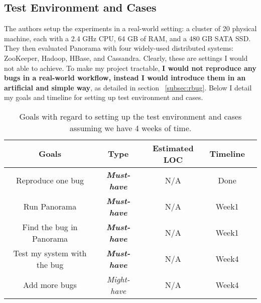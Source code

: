 \subsection{Test Environment and Cases}
The authors setup the experiments in a real-world setting: a cluster of 20 physical machine, each with a 2.4 GHz CPU, 64 GB of RAM, and a 480 GB SATA SSD. They then evaluated Panorama with four widely-used distributed systems: ZooKeeper, Hadoop, HBase, and Cassandra. Clearly, these are settings I would not able to achieve. To make my project tractable, \textbf{I would not reproduce any bugs in a real-world workflow, instead I would introduce them in an artificial and simple way}, as detailed in section ~\ref{subsec:rbug}. Below I detail my goals and timeline for setting up test environment and cases. 

\begin{table}[h!]
  \centering
  \begin{tabular}{ |c|c|c|c|c| } 
  \hline
  Goals & Type & Estimated LOC & Timeline \\
  \hline
  Reproduce one bug & \textit{\textbf{Must-have}} & N/A & Done\\ 
  Run Panorama & \textit{\textbf{Must-have}} & N/A & Week1\\ 
  Find the bug in Panorama & \textit{\textbf{Must-have}} & N/A & Week1 \\ 
  Test my system with the bug& \textit{\textbf{Must-have}} & N/A & Week4 \\ 
  Add more bugs& \textit{Might-have} & N/A & Week4 \\ 
  \hline
  \end{tabular}
  \caption{Goals with regard to setting up the test environment and cases assuming we have 4 weeks of time.}
  \label{table:2}
\end{table}




